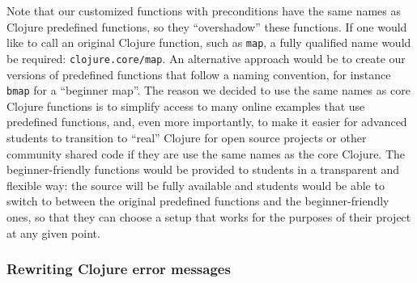\documentclass[submission,copyright,creativecommons]{eptcs}
\newcommand{\clocode}[1]{{\tt {#1}}}
\begin{document}
Note that our customized functions with preconditions have the same names as Clojure predefined functions, so they ``overshadow'' these functions. If one would like to call an original Clojure function, such as {\tt map}, a fully qualified name would be required: \clocode{clojure.core/map}. An alternative approach would be to create our versions of predefined functions that follow a naming convention, for instance \clocode{bmap} for a ``beginner map''. The reason we decided to use the same names as core Clojure functions is to simplify access to many online examples that use predefined functions, and, even more importantly, to make it easier for advanced students to transition to ``real'' Clojure for open source projects or other community shared code if they are use the same names as the core Clojure. The beginner-friendly functions would be provided to students in a transparent and flexible way: the source will be fully available and students would be able to switch to between the original predefined functions and the beginner-friendly ones,  so that they can choose a setup that works for the purposes of their project at any given point. 



\subsubsection{Rewriting Clojure error messages}\label{subsub:rewrite}
\end{document}
